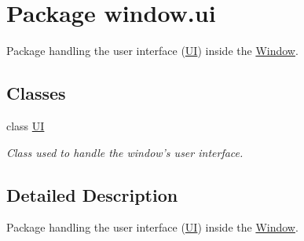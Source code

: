 \hypertarget{namespacewindow_1_1ui}{\section{Package window.\-ui}
\label{namespacewindow_1_1ui}
}


Package handling the user interface (\hyperlink{classwindow_1_1ui_1_1_u_i}{U\-I}) inside the \hyperlink{classwindow_1_1_window}{Window}.  


\subsection*{Classes}
\begin{DoxyCompactItemize}
\item 
class \hyperlink{classwindow_1_1ui_1_1_u_i}{U\-I}
\begin{DoxyCompactList}\small\item\em Class used to handle the window's user interface. \end{DoxyCompactList}\end{DoxyCompactItemize}


\subsection{Detailed Description}
Package handling the user interface (\hyperlink{classwindow_1_1ui_1_1_u_i}{U\-I}) inside the \hyperlink{classwindow_1_1_window}{Window}. 